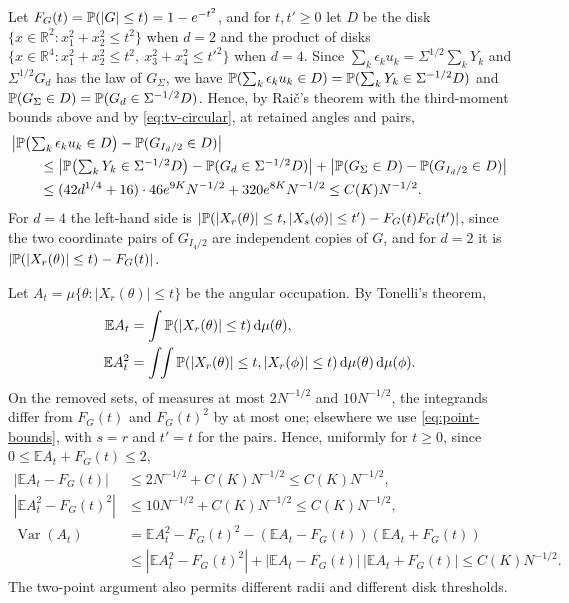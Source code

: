 Let $F_G(t)=\mathbb P(|G|\le t)=1-e^{-t^2}$, and for $t,t'\ge0$ let $D$ be
the disk $\{x\in\mathbb R^2:x_1^2+x_2^2\le t^2\}$ when $d=2$ and the
product of disks
$\{x\in\mathbb R^4:x_1^2+x_2^2\le t^2,\ x_3^2+x_4^2\le t'^2\}$ when $d=4$.
Since $\sum_k\epsilon_ku_k=\Sigma^{1/2}\sum_kY_k$ and $\Sigma^{1/2}G_d$
has the law of $G_\Sigma$, we have
$\mathbb P(\sum_k\epsilon_ku_k\in D)=\mathbb P(\sum_kY_k\in\Sigma^{-1/2}D)$ and
$\mathbb P(G_\Sigma\in D)=\mathbb P(G_d\in\Sigma^{-1/2}D)$. Hence, by Rai\v{c}'s
theorem with the third-moment bounds above and by \eqref{eq:tv-circular},
at retained angles and pairs,
\begin{align}
 &\bigl|\mathbb P\bigl(\textstyle\sum_k\epsilon_ku_k\in D\bigr)-\mathbb P(G_{I_d/2}\in D)\bigr|
 \nonumber\\
 &\qquad\le\bigl|\mathbb P\bigl(\textstyle\sum_kY_k\in\Sigma^{-1/2}D\bigr)
     -\mathbb P(G_d\in\Sigma^{-1/2}D)\bigr|
 +\bigl|\mathbb P(G_\Sigma\in D)-\mathbb P(G_{I_d/2}\in D)\bigr|
 \nonumber\\
 &\qquad\le(42d^{1/4}+16)\cdot46e^{9K}N^{-1/2}+320e^{8K}N^{-1/2}
 \le C(K)N^{-1/2}.\label{eq:point-bounds}
\end{align}
For $d=4$ the left-hand side is
$|\mathbb P(|X_r(\theta)|\le t,|X_s(\phi)|\le t')-F_G(t)F_G(t')|$, since the
two coordinate pairs of $G_{I_4/2}$ are independent copies of $G$, and
for $d=2$ it is $|\mathbb P(|X_r(\theta)|\le t)-F_G(t)|$.

Let $A_t=\mu\{\theta:|X_r(\theta)|\le t\}$ be the angular occupation.
By Tonelli's theorem,
\begin{align*}
 \mathbb EA_t&=\int\mathbb P(|X_r(\theta)|\le t)\,\mathrm d\mu(\theta),\\
 \mathbb EA_t^2&=\int\!\!\int
   \mathbb P(|X_r(\theta)|\le t,|X_r(\phi)|\le t)\,\mathrm d\mu(\theta)\,\mathrm d\mu(\phi).
\end{align*}
On the removed sets, of measures at most $2N^{-1/2}$ and $10N^{-1/2}$, the
integrands differ from $F_G(t)$ and $F_G(t)^2$ by at most one; elsewhere
we use \eqref{eq:point-bounds}, with $s=r$ and $t'=t$ for the pairs.
Hence, uniformly for $t\ge0$, since $0\le\mathbb EA_t+F_G(t)\le2$,
\begin{align}
 |\mathbb EA_t-F_G(t)|&\le2N^{-1/2}+C(K)N^{-1/2}\le C(K)N^{-1/2},\nonumber\\
 |\mathbb EA_t^2-F_G(t)^2|&\le10N^{-1/2}+C(K)N^{-1/2}\le C(K)N^{-1/2},\nonumber\\
 \operatorname{Var}(A_t)
 &=\mathbb EA_t^2-F_G(t)^2-(\mathbb EA_t-F_G(t))(\mathbb EA_t+F_G(t))
 \nonumber\\
 &\le|\mathbb EA_t^2-F_G(t)^2|
       +|\mathbb EA_t-F_G(t)|\,|\mathbb EA_t+F_G(t)|
 \le C(K)N^{-1/2}.\label{eq:occupation-bounds}
\end{align}
The two-point argument also permits different radii and different disk
thresholds.

